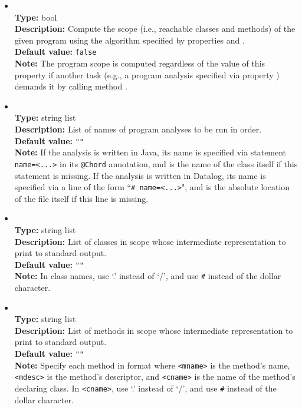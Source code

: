 \begin{itemize}
\item
{} \\
{\bf Type:} bool \\
{\bf Description:} Compute the scope (i.e., reachable classes and methods) of the given program using the algorithm specified by properties  and . \\
{\bf Default value:} {\tt false} \\
{\bf Note:} The program scope is computed regardless of the value of this property if another task (e.g., a program analysis specified via property ) demands it by calling method .

\item
{} \\
{\bf Type:} string list \\
{\bf Description:} List of names of program analyses to be run in order. \\
{\bf Default value:} {\tt ""} \\
{\bf Note:} If the analysis is written in Java, its name is specified via statement {\tt name=<...>} in its {\tt @Chord} annotation, and is the name of the class itself if this statement is missing.  If the analysis is written in Datalog, its name is specified via a line of the form ``{\tt \# name=<...>}", and is the absolute location of the file itself if this line is missing.

\item
{} \\
{\bf Type:} string list \\
{\bf Description:} List of classes in scope whose intermediate representation to print to standard output. \\
{\bf Default value:} {\tt ""} \\
{\bf Note:} In class names, use `.' instead of `/', and use {\tt \#} instead of the dollar character.

\item
{} \\
{\bf Type:} string list \\
{\bf Description:} List of methods in scope whose intermediate representation to print to standard output. \\
{\bf Default value:} {\tt ""} \\
{\bf Note:} Specify each method in format  where {\tt <mname>} is the method's name, {\tt <mdesc>} is the method's descriptor, and {\tt <cname>} is the name of the method's declaring class. In {\tt <cname>}, use `.' instead of `/', and use {\tt \#} instead of the dollar character.


\end{itemize}
